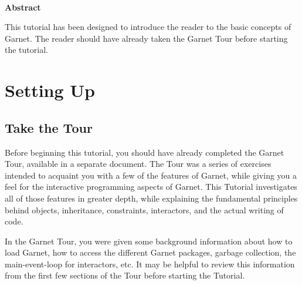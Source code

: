 
\begin{titlepage}
\vspace{0.6in}

 \\

\vspace{0.3in} 
\centering{\today{}}
  \vspace{0.5in}
  \begin{center} {\bf Abstract}\end{center}
  This tutorial has been designed to introduce the reader to the basic
  concepts of Garnet.  The reader should have already taken the Garnet
  Tour before starting the tutorial.  \vspace{0.5in}
  
\end{titlepage}


% 

\chapter{Setting Up}

\section{Take the Tour}

Before beginning this tutorial, you should have already completed the
Garnet Tour, available in a separate document.  The Tour was a series
of exercises intended to acquaint you with a few of the features of
Garnet, while giving you a feel for the interactive programming aspects
of Garnet.  This Tutorial investigates all of those features in
greater depth, while explaining the fundamental principles behind
objects, inheritance, constraints, interactors, and the actual writing
of code.

In the Garnet Tour, you were given some background information about
how to load Garnet, how to access the different Garnet packages,
garbage collection, the main-event-loop for interactors, etc.  It may
be helpful to review this information from the first few sections of
the Tour before starting the Tutorial.


